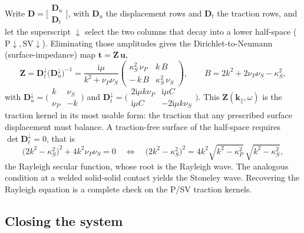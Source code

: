 \documentclass[11pt,a4paper]{article}
\newcommand{\ii}{\mathrm{i}}
\newcommand{\kpar}{\mathbf{k}_{\parallel}}
\begin{document}
Write $\mathbf{D}=\big[\begin{smallmatrix}\mathbf{D}_u\\[1pt]\mathbf{D}_t\end{smallmatrix}\big]$,
with $\mathbf{D}_u$ the displacement rows and $\mathbf{D}_t$ the traction rows, and let the
superscript $\downarrow$ select the two columns that decay into a lower half-space
($\mathrm{P}{\downarrow},\mathrm{SV}{\downarrow}$). Eliminating those amplitudes gives the
Dirichlet-to-Neumann (surface-impedance) map $\mathbf{t}=\mathbf{Z}\,\mathbf{u}$,
\begin{equation}
\label{eq:Zimp}
\mathbf{Z}=\mathbf{D}_t^{\downarrow}\big(\mathbf{D}_u^{\downarrow}\big)^{-1}
=\frac{\ii\mu}{k^{2}+\nu_P\nu_S}
\begin{pmatrix}
\kappa_S^{2}\,\nu_P & k\,B\\[2pt]
-\,k\,B & \kappa_S^{2}\,\nu_S
\end{pmatrix},
\qquad B=2k^{2}+2\nu_P\nu_S-\kappa_S^{2},
\end{equation}
with $\mathbf{D}_u^{\downarrow}=\big(\begin{smallmatrix}k&\nu_S\\ \nu_P&-k\end{smallmatrix}\big)$
and $\mathbf{D}_t^{\downarrow}=\big(\begin{smallmatrix}2\ii\mu k\nu_P&\ii\mu C\\
\ii\mu C&-2\ii\mu k\nu_S\end{smallmatrix}\big)$. This $\mathbf{Z}(\kpar,\omega)$ is the traction
kernel in its most usable form: the traction that any prescribed surface displacement must
balance. A traction-free surface of the half-space requires $\det\mathbf{D}_t^{\downarrow}=0$,
that is
\begin{equation}
\big(2k^{2}-\kappa_S^{2}\big)^{2}+4k^{2}\nu_P\nu_S=0
\quad\Longleftrightarrow\quad
\big(2k^{2}-\kappa_S^{2}\big)^{2}=4k^{2}\sqrt{k^{2}-\kappa_P^{2}}\,\sqrt{k^{2}-\kappa_S^{2}},
\end{equation}
the Rayleigh secular function, whose root is the Rayleigh wave. The analogous condition at a
welded solid-solid contact yields the Stoneley wave. Recovering the Rayleigh equation is a
complete check on the P/SV traction kernels.

\subsection{Closing the system}
\end{document}
